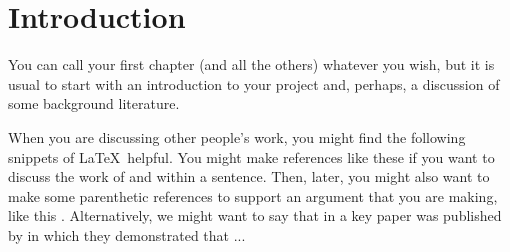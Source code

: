 \documentclass{somasmsc}
\begin{document}
\newcommand{\yourtitle}{Your title goes here}
\newcommand{\yourname}{Your name goes here}


\pagestyle{empty}
\frontmatter
\maketitle
\pagestyle{plain}
\tableofcontents
\newpage



\setlength{\headheight}{16pt}
\fancyhead{}
\fancyfoot{}
\pagestyle{fancy}
\fancyhead[RO,LE]{\thepage}
\fancyhead[LO,RE]{\rightmark}

\newcommand{\studentcomment}[1]{\todo[inline, backgroundcolor=blue!30]{\textsc{\yourname:} #1}}
\newcommand{\DSWcomment}[1]{\todo[inline, backgroundcolor=green!30]{\textsc{DSW:} #1}}
\newcommand{\supcomment}[1]{\todo[inline, backgroundcolor=red!30]{\textsc{Supervisor:} #1}}

\mainmatter



\chapter{Introduction}\label{intro}
You can call your first chapter (and all the others) whatever you wish, but it is usual to start with an introduction to your project and, perhaps, a discussion of some background literature.

When you are discussing other people's work, you might find the following snippets of \LaTeX\ helpful.  You might make references like these if you want to discuss the work of \citet{lambert} and \citet{dellas} within a sentence. Then, later, you might also want to make some parenthetic references to support an argument that you are making, like this \citep{lambert}.  Alternatively, we might want to say that in \citeyear{lambert} a key paper was published by \citeauthor{lambert} in which they demonstrated that ...
\end{document}
